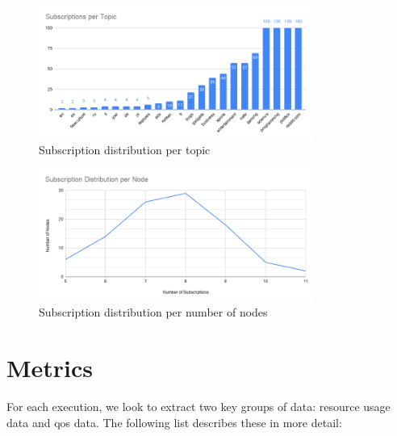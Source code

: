 \begin{figure}[!htb]
  \centering
  \includegraphics[width=0.8\textwidth]{../images/subscriptions-per-topic.png}
  \caption{Subscription distribution per topic}
  \label{fig:subscriptions-per-topic}
\end{figure}

\begin{figure}[!htb]
  \centering
  \includegraphics[width=0.8\textwidth]{../images/subscription-distribution-per-node.png}
  \caption{Subscription distribution per number of nodes}
  \label{fig:subscription-distribution-per-node}
\end{figure}

\section{Metrics}\label{metrics}

For each execution, we look to extract two key groups of data: resource usage
data and \acrshort{qos} data. The following list describes these in more detail:

